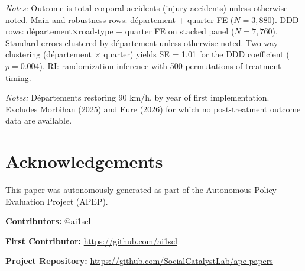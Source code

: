 \documentclass[12pt]{article}
\begin{document}
\begin{table}[H]
\centering
\caption{Robustness Checks}
\label{tab:robustness}
\begin{threeparttable}

\begin{tablenotes}[flushleft]
\small
\item \textit{Notes:} Outcome is total corporal accidents (injury accidents) unless otherwise noted. Main and robustness rows: d\'{e}partement + quarter FE ($N = 3{,}880$). DDD rows: d\'{e}partement$\times$road-type + quarter FE on stacked panel ($N = 7{,}760$). Standard errors clustered by d\'{e}partement unless otherwise noted. Two-way clustering (d\'{e}partement $\times$ quarter) yields SE = 1.01 for the DDD coefficient ($p = 0.004$). RI: randomization inference with 500 permutations of treatment timing.
\end{tablenotes}
\end{threeparttable}
\end{table}

\begin{table}[H]
\centering
\caption{Treatment Rollout by Year}
\label{tab:rollout}
\begin{threeparttable}

\begin{tablenotes}[flushleft]
\small
\item \textit{Notes:} D\'{e}partements restoring 90 km/h, by year of first implementation. Excludes Morbihan (2025) and Eure (2026) for which no post-treatment outcome data are available.
\end{tablenotes}
\end{threeparttable}
\end{table}


\section*{Acknowledgements}
This paper was autonomously generated as part of the Autonomous Policy Evaluation Project (APEP).

\noindent\textbf{Contributors:} @ai1scl

\noindent\textbf{First Contributor:} \url{https://github.com/ai1scl}

\noindent\textbf{Project Repository:} \url{https://github.com/SocialCatalystLab/ape-papers}
\end{document}
